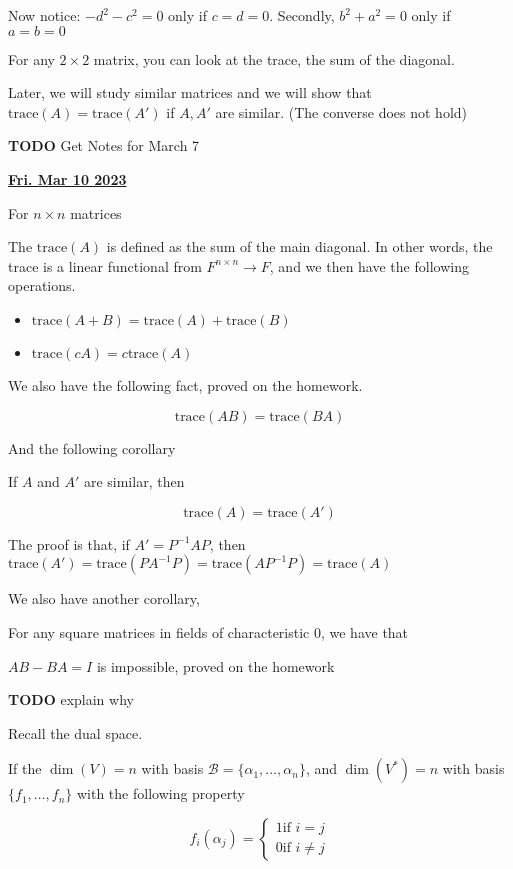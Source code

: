 \documentclass[12pt]{article}
\def\trace{\text{trace}}
\def\B{\mathcal B}
\renewcommand{\date}[1]{\underline{\bf #1}}
\newcommand{\TODO}{\color{red}\textbf{TODO}\color{black}}
\begin{document}
  Now notice: $-d^2 - c^2 = 0$ only if $c = d = 0$. Secondly, $b^2 + a^2 = 0$
  only if $a = b = 0$

  For any $2 \times 2$ matrix, you can look at the trace, the sum of the
  diagonal.

  Later, we will study similar matrices and we will show that $\text{trace}(A) =
  \text{trace}(A')$ if $A, A'$ are similar. (The converse does not hold)

  \TODO{} Get Notes for March 7

  \date{Fri. Mar 10 2023}

  For $n \times n$ matrices

  The $\trace(A)$ is defined as the sum of the main diagonal. In other words,
  the trace is a linear functional from $F^{n \times n} \to F$, and we then have
  the following operations.

  \begin{itemize}
    \item $\trace(A + B) = \trace(A) + \trace(B)$
    \item $\trace(cA) = c\trace(A)$
  \end{itemize}

  We also have the following fact, proved on the homework.

  \[
    \trace(AB) = \trace(BA)
  \]

  And the following corollary

  If $A$ and $A'$ are similar, then

  \[
    \trace(A) = \trace(A')
  \]

  The proof is that, if $A' = P^{-1} A P$, then $\trace(A') = \trace(P A^{-1} P)
  = \trace(A P^{-1} P) = \trace(A)$

  We also have another corollary,

  For any square matrices in fields of characteristic $0$, we have that

  $AB - BA = I$ is impossible, proved on the homework

  \TODO{} explain why

  Recall the dual space.

  If the $\dim(V) = n$ with basis $\B = \{\alpha_1, \dots, \alpha_n\}$, and
  $\dim(V^*) = n$ with basis $\{f_1, \dots, f_n \}$ with the following property

  \[
    f_i(\alpha_j) = \begin{cases}
      1 \text{if $i = j$} \\
      0 \text{if $i \ne j$}
    \end{cases}
  \]
\end{document}
